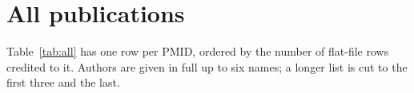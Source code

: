 
\section{All publications}\label{sec:all}

Table~\ref{tab:all} has one row per PMID, ordered by the number of flat-file
rows credited to it. Authors are given in full up to six names; a longer list
is cut to the first three and the last.


